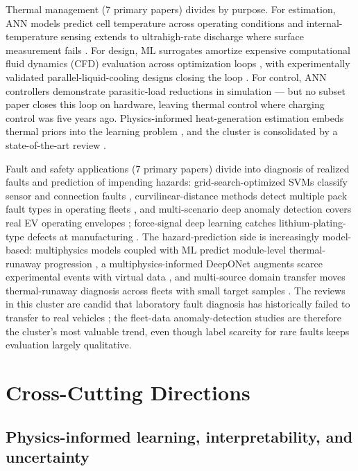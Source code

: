 \documentclass[journal]{IEEEtran}
\begin{document}
Thermal management (7 primary papers) divides by purpose. For estimation, ANN models predict cell temperature across operating conditions \cite{r72} and internal-temperature sensing extends to ultrahigh-rate discharge where surface measurement fails \cite{r83}. For design, ML surrogates amortize expensive computational fluid dynamics (CFD) evaluation across optimization loops \cite{r84}\cite{r73}, with experimentally validated parallel-liquid-cooling designs closing the loop \cite{r85}. For control, ANN controllers demonstrate parasitic-load reductions in simulation \cite{r86} --- but no subset paper closes this loop on hardware, leaving thermal control where charging control was five years ago. Physics-informed heat-generation estimation embeds thermal priors into the learning problem \cite{r9}, and the cluster is consolidated by a state-of-the-art review \cite{r25}.

Fault and safety applications (7 primary papers) divide into diagnosis of realized faults and prediction of impending hazards: grid-search-optimized SVMs classify sensor and connection faults \cite{r74}, curvilinear-distance methods detect multiple pack fault types in operating fleets \cite{r87}, and multi-scenario deep anomaly detection covers real EV operating envelopes \cite{r88}; force-signal deep learning catches lithium-plating-type defects at manufacturing \cite{r89}. The hazard-prediction side is increasingly model-based: multiphysics models coupled with ML predict module-level thermal-runaway progression \cite{r75}, a multiphysics-informed DeepONet augments scarce experimental events with virtual data \cite{r90}, and multi-source domain transfer moves thermal-runaway diagnosis across fleets with small target samples \cite{r76}. The reviews in this cluster are candid that laboratory fault diagnosis has historically failed to transfer to real vehicles \cite{r24}\cite{r23}; the fleet-data anomaly-detection studies are therefore the cluster's most valuable trend, even though label scarcity for rare faults keeps evaluation largely qualitative.

\section{Cross-Cutting Directions}

\subsection{Physics-informed learning, interpretability, and uncertainty}
\end{document}
